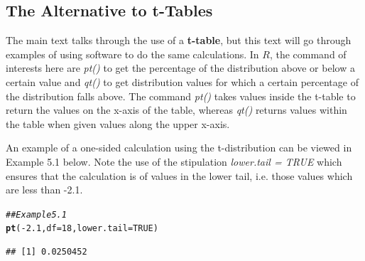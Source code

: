 \documentclass{report}\usepackage[]{graphicx}\usepackage[]{color}
\makeatletter
\newcommand{\hlnum}[1]{\textcolor[rgb]{0.686,0.059,0.569}{#1}}%
\newcommand{\hlcom}[1]{\textcolor[rgb]{0.678,0.584,0.686}{\textit{#1}}}%
\newcommand{\hlopt}[1]{\textcolor[rgb]{0,0,0}{#1}}%
\newcommand{\hlstd}[1]{\textcolor[rgb]{0.345,0.345,0.345}{#1}}%
\newcommand{\hlkwc}[1]{\textcolor[rgb]{0.333,0.667,0.333}{#1}}%
\newcommand{\hlkwd}[1]{\textcolor[rgb]{0.737,0.353,0.396}{\textbf{#1}}}%
\newenvironment{kframe}{%
 \def\at@end@of@kframe{}%
 \ifinner\ifhmode%
  \def\at@end@of@kframe{\end{minipage}}%
  \begin{minipage}{\columnwidth}%
 \fi\fi%
 \def\FrameCommand##1{\hskip\@totalleftmargin \hskip-\fboxsep
 \colorbox{shadecolor}{##1}\hskip-\fboxsep
     \hskip-\linewidth \hskip-\@totalleftmargin \hskip\columnwidth}%
 \MakeFramed {\advance\hsize-\width
   \@totalleftmargin\z@ \linewidth\hsize
   \@setminipage}}%
 {\par\unskip\endMakeFramed%
 \at@end@of@kframe}
\newenvironment{knitrout}{}{} %
\makeatother
\begin{document}
\subsection{The Alternative to t-Tables}
The main text talks through the use of a \textbf{t-table}, but this text will go through examples of using software to do the same calculations.  In $R$, the command of interests here are \textit{pt()} to get the percentage of the distribution above or below a certain value and \textit{qt()} to get distribution values for which a certain percentage of the distribution falls above.  The command \textit{pt()} takes values inside the t-table to return the values on the x-axis of the table, whereas \textit{qt()} returns values within the table when given values along the upper x-axis.  

An example of a one-sided calculation using the t-distribution can be viewed in Example 5.1 below.  Note the use of the stipulation \textit{lower.tail = TRUE} which ensures that the calculation is of values in the lower tail, i.e. those values which are less than -2.1.  
\begin{knitrout}
\color{fgcolor}\begin{kframe}
\begin{alltt}
\hlcom{## Example 5.1 }
\hlkwd{pt}\hlstd{(}\hlopt{-}\hlnum{2.1}\hlstd{,} \hlkwc{df} \hlstd{=} \hlnum{18}\hlstd{,} \hlkwc{lower.tail} \hlstd{=} \hlnum{TRUE}\hlstd{)}
\end{alltt}
\begin{verbatim}
## [1] 0.0250452
\end{verbatim}
\end{kframe}
\end{knitrout}
\end{document}
